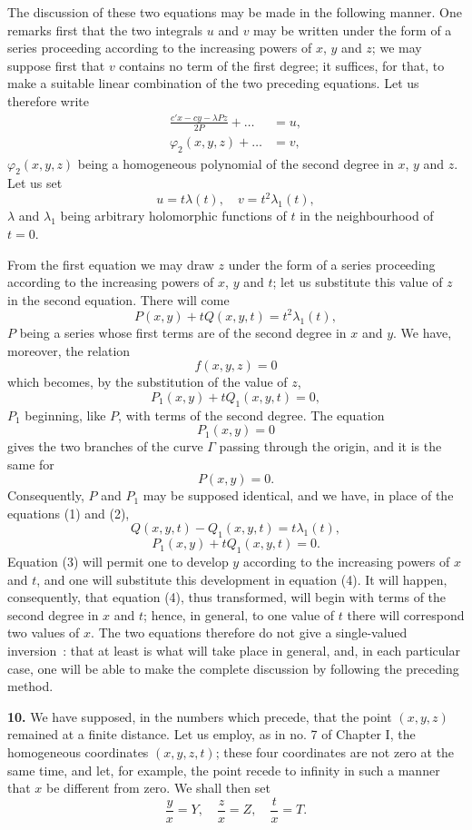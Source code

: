 \documentclass{article}
\begin{document}
The discussion of these two equations may be made in the following manner. One remarks first that the two integrals $u$ and $v$ may be written under the form of a series proceeding according to the increasing powers of $x$, $y$ and $z$; we may suppose first that $v$ contains no term of the first degree; it suffices, for that, to make a suitable linear combination of the two preceding equations. Let us therefore write
\[
\begin{aligned}
\frac{c'x - cy - \lambda Pz}{2P} + \ldots &= u, \\
\varphi_{2}(x, y, z) + \ldots &= v,
\end{aligned}
\]
$\varphi_{2}(x, y, z)$ being a homogeneous polynomial of the second degree in $x$, $y$ and $z$. Let us set
\[
u = t\lambda(t), \quad v = t^{2}\lambda_{1}(t),
\]
$\lambda$ and $\lambda_{1}$ being arbitrary holomorphic functions of $t$ in the neighbourhood of $t = 0$.

From the first equation we may draw $z$ under the form of a series proceeding according to the increasing powers of $x$, $y$ and $t$; let us substitute this value of $z$ in the second equation. There will come
\[
P(x, y) + tQ(x, y, t) = t^{2}\lambda_{1}(t), \tag{1}
\]
$P$ being a series whose first terms are of the second degree in $x$ and $y$. We have, moreover, the relation
\[
f(x, y, z) = 0
\]
which becomes, by the substitution of the value of $z$,
\[
P_{1}(x, y) + tQ_{1}(x, y, t) = 0, \tag{2}
\]
$P_{1}$ beginning, like $P$, with terms of the second degree. The equation
\[
P_{1}(x, y) = 0
\]
gives the two branches of the curve $\Gamma$ passing through the origin, and it is the same for
\[
P(x, y) = 0.
\]
Consequently, $P$ and $P_{1}$ may be supposed identical, and we have, in place of the equations (1) and (2),
\[
Q(x, y, t) - Q_{1}(x, y, t) = t\lambda_{1}(t), \tag{3}
\]
\[
P_{1}(x, y) + tQ_{1}(x, y, t) = 0. \tag{4}
\]
Equation (3) will permit one to develop $y$ according to the increasing powers of $x$ and $t$, and one will substitute this development in equation (4). It will happen, consequently, that equation (4), thus transformed, will begin with terms of the second degree in $x$ and $t$; hence, in general, to one value of $t$ there will correspond two values of $x$. The two equations therefore do not give a single-valued inversion~: that at least is what will take place in general, and, in each particular case, one will be able to make the complete discussion by following the preceding method.

\textbf{10.} We have supposed, in the numbers which precede, that the point $(x, y, z)$ remained at a finite distance. Let us employ, as in no. 7 of Chapter I, the homogeneous coordinates $(x, y, z, t)$; these four coordinates are not zero at the same time, and let, for example, the point recede to infinity in such a manner that $x$ be different from zero. We shall then set
\[
\frac{y}{x} = Y, \quad \frac{z}{x} = Z, \quad \frac{t}{x} = T.
\]
\end{document}
